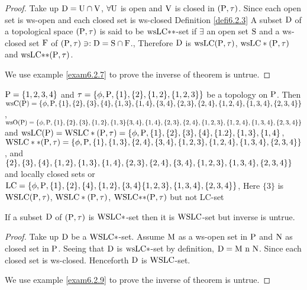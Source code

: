\begin{proof}
Take up $\mathrm{D} = \mathrm{U} \cap \mathrm{V}$, $\forall \mathrm{U}$ is open and $\mathrm{V}$ is closed in $(\mathrm{P}, \tau)$. Since each open set is ws-open and each closed set is ws-closed Definition \ref{defi6.2.3} A subset $\mathrm{D}$ of a topological space $(\mathrm{P}, \tau)$ is said to be $\mathrm{ws}\mathrm{LC}{*}{*}$-set if $\exists$ an open set $\mathrm{S}$ and a ws-closed set $\mathrm{F}$ of $(\mathrm{P}, \tau) \ni: \mathrm{D} = \mathrm{S}\cap \mathrm{F}$., Therefore $\mathrm{D}$ is $\mathrm{ws}\mathrm{LC} (\mathrm{P}, \tau)$, $\mathrm{ws}\mathrm{LC}*(\mathrm{P}, \tau)$ and $\mathrm{ws}\mathrm{LC}{*}{*}(\mathrm{P}, \tau)$.

We use example \ref{exam6.2.7} to prove the inverse of theorem is untrue.
\end{proof}

\begin{exm}\label{exam6.2.7}
$\mathrm{P} = \{1, 2, 3, 4\}$ and $\tau = \{\phi, \mathrm{P}, \{1\}, \{2\}, \{1, 2\}, \{1,2, 3\}\}$ be a topology on $\mathrm{P}$. Then $\ws\TSC(\TSP) = \{\phi, \TSP, \{1\}, \{2\}, \{3\}, \{4\}, \{1,3\}, \{1,4\},\{3,4\},\{2,3\}, \{2,4\},\break \{1,2, 4\},\{1,3,4\},\{2,3,4\}\}$, $\ws\TSO(\TSP) = \{\phi, \TSP, \{1\}, \{2\}, \{3\},\{1,2\},\{1,3\} \{3,4\}, \{1,4\},\break \{2,3\}, \{2,4\}, \{1,2,3\},\{1,2,4\},\{1,3,4\},\{2,3,4\}\}$ and $\mathrm{ws}\mathrm{LC}(\mathrm{P})= \mathrm{WSLC}*(\mathrm{P}, \tau) = \{\phi, \mathrm{P} ,\{1\}, \{2\}, \{3\},\{4\},\{1.2\},\{1,3\}, \{1,4\}$, $\WSLC**(\TSP,\tau)=\{\phi,\TSP,\{1\},\{1,3\},\break \{2,4\}, \{3,4\}, \{1,2,3\},\{1,2,4\},\{1,3,4\},\{2,3,4\}\}$, and $\{2\}, \{3\}, \{4\}, \{1,2\}, \{1,3\},\break \{1,4\}, \{2,3\},\{2,4\},\{3,4\},\{1,2,3\},\{1,3,4\},\{2,3,4\}\}$ and locally closed sets or $\mathrm{LC} = \{\phi, \mathrm{P}, \{1\}, \{2\}, \{4\}, \{1,2\}, \{3, 4\}\{1,2,3\},\{1,3,4\},\{2,3,4\}\}$, Here $\{3\}$ is $\mathrm{WSLC} (\mathrm{P}, \tau)$, $\mathrm{WSLC}*(\mathrm{P}, \tau)$, $\mathrm{WSLC}{*}{*}(\mathrm{P}, \tau)$ but not LC-set
\end{exm}

\begin{thm}\label{thm6.2.8}
If a subset $\mathrm{D}$ of $(\mathrm{P}, \tau)$ is $\mathrm{WSLC}*$-set then it is $\mathrm{WSLC}$-set but inverse is untrue.
\end{thm}

\begin{proof}
Take up $\mathrm{D}$ be a $\mathrm{WSLC}*$-set. Assume $\mathrm{M}$ as a ws-open set in $\mathrm{P}$ and $\mathrm{N}$ as closed set in $\mathrm{P}$. Seeing that $\mathrm{D}$ is $\mathrm{ws}\mathrm{LC}*$-set by definition, $\mathrm{D} = \mathrm{M} \ \mathrm{n} \ \mathrm{N}$. Since each closed set is ws-closed. Henceforth $\mathrm{D}$ is $\mathrm{WSLC}$-set.

We use example \ref{exam6.2.9} to prove the inverse of theorem is untrue.
\end{proof}

